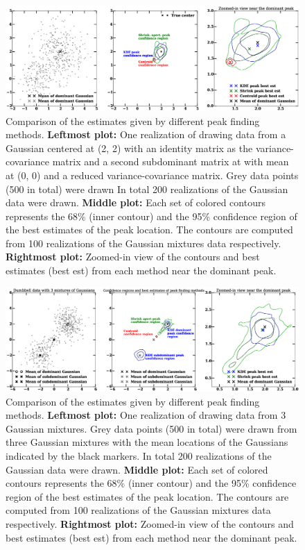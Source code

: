 \documentclass[letterpaper,useAMS,usenatbib]{mn2e}
\begin{document}
\begin{figure}
	\includegraphics[width=.95\linewidth]{confidence_regions_bimodal_500.eps}
	\caption{Comparison of the estimates given by different peak finding methods.
		{\bf Leftmost plot:} One realization of drawing data from a Gaussian
		centered at (2, 2) with an identity matrix as the variance-covariance
		matrix and a second subdominant matrix at with mean at (0, 0) and a reduced
		variance-covariance matrix. Grey data points (500 in total) were drawn 
		In total 200 realizations of the Gaussian data were drawn.
		{\bf Middle plot:} Each set of colored contours represents the
		68\% (inner contour) and the 95\% confidence region of the best estimates
		of the peak location. The contours are computed from 100 realizations of the Gaussian
		mixtures data respectively. {\bf Rightmost plot:} Zoomed-in view of the
		contours and best estimates (best est) from each method near the dominant peak.  
		\label{fig:bimodalGaussian500}}
\end{figure}
\begin{figure}
	\includegraphics[width=.95\linewidth]{confidence_regions_dumbbell_500.eps}
	\caption{Comparison of the estimates given by different peak finding methods.
		{\bf Leftmost plot:} One realization of drawing data from 3 Gaussian
		mixtures. Grey data points (500 in total) were drawn from three
		Gaussian mixtures with the mean locations of the Gaussians indicated by the
		black markers. In total 200 realizations of the Gaussian data were drawn.
		{\bf Middle plot:} Each set of colored contours represents the
		68\% (inner contour) and the 95\% confidence region of the best estimates
		of the peak location. The contours are computed from 100 realizations of the Gaussian
		mixtures data respectively. {\bf Rightmost plot:} Zoomed-in view of the
		contours and best estimates (best est) from each method near the dominant peak.  
		\label{fig:dumbbell500}}
\end{figure}
\clearpage\bsp\label{lastpage} 
\end{document}
